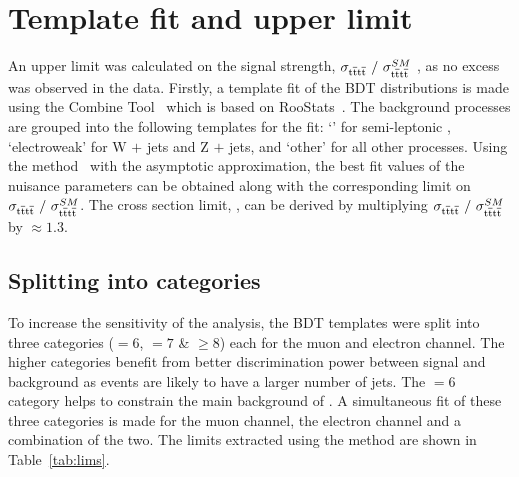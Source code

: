 
\section{Template fit and upper limit}
\label{sec:limit}

An upper limit was calculated on the signal strength, $\sigma_{{\mathrm{t}\overline{\mathrm{t}}\mathrm{t}\overline{\mathrm{t}}}}~/~\sigma_{{\mathrm{t}\overline{\mathrm{t}}\mathrm{t}\overline{\mathrm{t}}}}^{SM} $ , as no excess was observed in the data. Firstly, a template fit of the BDT distributions is made using the Combine Tool~\cite{CMS-NOTE-2011-005} which is based on RooStats~\cite{RooStats:2010,Read:2002hq,Junk:1999kv,Cowan:2011js}.
The background processes are grouped into the following templates for the fit: `\ttbar' for semi-leptonic \ttbar, `electroweak' for W $+$ jets and Z $+$ jets, and `\ttbar\textunderscore other' for all other \ttbar processes. Using the \CLS method~\cite{Junk1999435,0954-3899-28-10-313} with the asymptotic approximation, the best fit values of the nuisance parameters can be obtained along with the corresponding limit on $\sigma_{{\mathrm{t}\overline{\mathrm{t}}\mathrm{t}\overline{\mathrm{t}}}}~/~\sigma_{{\mathrm{t}\overline{\mathrm{t}}\mathrm{t}\overline{\mathrm{t}}}}^{SM} $. The cross section limit, \sigmatttt, can be derived by multiplying $\sigma_{{\mathrm{t}\overline{\mathrm{t}}\mathrm{t}\overline{\mathrm{t}}}}~/~\sigma_{{\mathrm{t}\overline{\mathrm{t}}\mathrm{t}\overline{\mathrm{t}}}}^{SM} $ by \sigmattttSM $\approx 1.3$.

\subsection{Splitting into \njets categories}
\label{sec:njetcatlimit}
To increase the sensitivity of the analysis, the BDT templates were split into three \njets categories (\njets $= 6$, \njets $= 7 $ \& \njets $\geq 8$) each for the muon and electron channel. The higher \njets categories benefit from better discrimination power between signal and background as \tttt events are likely to have a larger number of jets. The \njets $= 6$ category helps to constrain the main background of \ttbar. A simultaneous fit of these three \njets categories is made for the muon channel, the electron channel and a combination of the two. The limits extracted using the \CLS method are shown in Table~\ref{tab:lims}.


